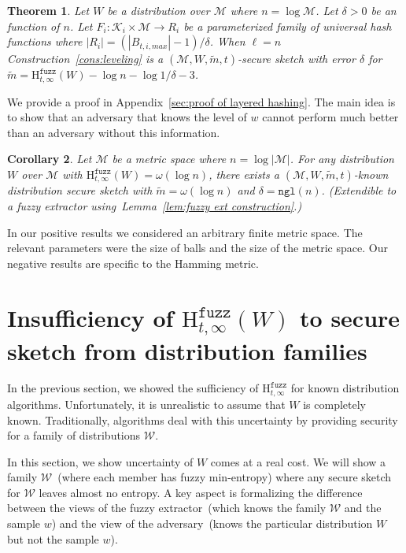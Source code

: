 \documentclass[11pt]{article}
\newcommand{\apref}[1]{\mbox{Appendix~\ref{#1}}}
\newcommand{\lemref}[1]{\mbox{Lemma~\ref{#1}}}
\newcommand{\consref}[1]{\mbox{Construction~\ref{#1}}}
\newcommand{\ngl}{\ensuremath{\mathtt{ngl}}\xspace}
\newcommand{\Hfuzz}{\mathrm{H}^{\mathtt{fuzz}}_{t,\infty}}
\newtheorem{theorem}{Theorem}[section]
\newtheorem{corollary}[theorem]{Corollary}
\newcommand{\M}{\mathcal{M}}
\begin{document}
\begin{theorem}
\label{thm:layered hashing}
Let $W$ be a distribution over $\mathcal{M}$ where $n =\log \M$.  Let $\delta>0$ be an function of $n$.  Let $F_i: \mathcal{K}_i \times \mathcal{M}\rightarrow R_i$ be a parameterized family of universal hash functions where $|R_i| = (|B_{t, i, max}|-1) /\delta$.  When $\ell = n$ \consref{cons:leveling} is a $(\mathcal{M}, W, \tilde{m}, t)$-secure sketch with error $\delta$ for $\tilde{m} = \Hfuzz(W) - \log n - \log 1/\delta - 3$.

\end{theorem}
We provide a proof in \apref{sec:proof of layered hashing}.  The main idea is to show that an adversary that knows the level of $w$ cannot perform much better than an adversary without this information.  

\begin{corollary}
\label{cor:extension to fuzz ext}
Let $\mathcal{M}$ be a metric space where $n = \log |\M|$.
For any distribution $W$ over $\mathcal{M}$ with $\Hfuzz(W)=\omega(\log n)$, there exists a $(\mathcal{M}, W, \tilde{m}, t)$-known distribution secure sketch with $\tilde{m} = \omega(\log n)$ and $\delta = \ngl(n)$.  (Extendible to a fuzzy extractor using~\lemref{lem:fuzzy ext construction}.)
\end{corollary}

\noindent
In our positive results we considered an arbitrary finite metric space.  The relevant parameters were the size of balls and the size of the metric space.  Our negative results are specific to the Hamming metric.
\section{Insufficiency of $\Hfuzz(W)$ to secure sketch from distribution families}
\label{sec:family of dist}

In the previous section, we showed the sufficiency of $\Hfuzz$ for known distribution algorithms.  Unfortunately, it is unrealistic to assume that $W$ is completely known.  Traditionally, algorithms deal with this uncertainty by providing security for a family of distributions $\mathcal{W}$.  

In this section, we show uncertainty of $W$ comes at a real cost. 
We will show a family $\mathcal{W}$~(where each member has fuzzy min-entropy) where any secure sketch for $\mathcal{W}$ leaves almost no entropy.  A key aspect is formalizing the difference between the views of the fuzzy extractor~(which knows the family $\mathcal{W}$ and the sample $w$) and the view of the adversary~(knows the particular distribution $W$ but not the sample $w$).
\end{document}
